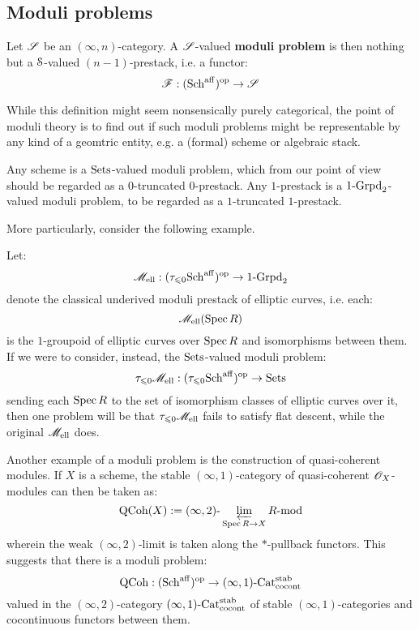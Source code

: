        \subsection{Moduli problems}
            \begin{definition}
                Let $\scrS$ be an $(\infty, n)$-category. A $\scrS$-valued \textbf{moduli problem} is then nothing but a $\S$-valued $(n - 1)$-prestack, i.e. a functor:
                    $$\scrF: (\Sch^{\aff})^{\op} \to \scrS$$
            \end{definition}
            While this definition might seem nonsensically purely categorical, the point of moduli theory is to find out if such moduli problems might be representable by any kind of a geomtric entity, e.g. a (formal) scheme or algebraic stack.
            \begin{example}
                Any scheme is a $\Sets$-valued moduli problem, which from our point of view should be regarded as a $0$-truncated $0$-prestack. Any $1$-prestack is a $1\-\Grpd_2$-valued moduli problem, to be regarded as a $1$-truncated $1$-prestack.  
            \end{example}
            \begin{example}
                More particularly, consider the following example.

                Let:
                    $$\scrM_{\elliptic}: (\tau_{\leq 0}\Sch^{\aff})^{\op} \to 1\-\Grpd_2$$
                denote the classical underived moduli prestack of elliptic curves, i.e. each:
                    $$\scrM_{\elliptic}(\Spec R)$$
                is the $1$-groupoid of elliptic curves over $\Spec R$ and isomorphisms between them. If we were to consider, instead, the $\Sets$-valued moduli problem:
                    $$\tau_{\leq 0}\scrM_{\elliptic}: (\tau_{\leq 0}\Sch^{\aff})^{\op} \to \Sets$$
                sending each $\Spec R$ to the set of isomorphism classes of elliptic curves over it, then one problem will be that $\tau_{\leq 0}\scrM_{\elliptic}$ fails to satisfy flat descent, while the original $\scrM_{\elliptic}$ does. 
            \end{example}
            \begin{example}
                Another example of a moduli problem is the construction of quasi-coherent modules. If $X$ is a scheme, the stable $(\infty, 1)$-category of quasi-coherent $\scrO_X$-modules can then be taken as:
                    $$\QCoh(X) := (\infty, 2)\-\projlim_{\Spec R \to X} R\mod$$
                wherein the weak $(\infty, 2)$-limit is taken along the $*$-pullback functors. This suggests that there is a moduli problem:
                    $$\QCoh: (\Sch^{\aff})^{\op} \to (\infty, 1)\-\Cat^{\stab}_{\co\cont}$$
                valued in the $(\infty, 2)$-category $(\infty, 1)\-\Cat^{\stab}_{\co\cont}$ of stable $(\infty, 1)$-categories and cocontinuous functors between them. 
            \end{example}
    
